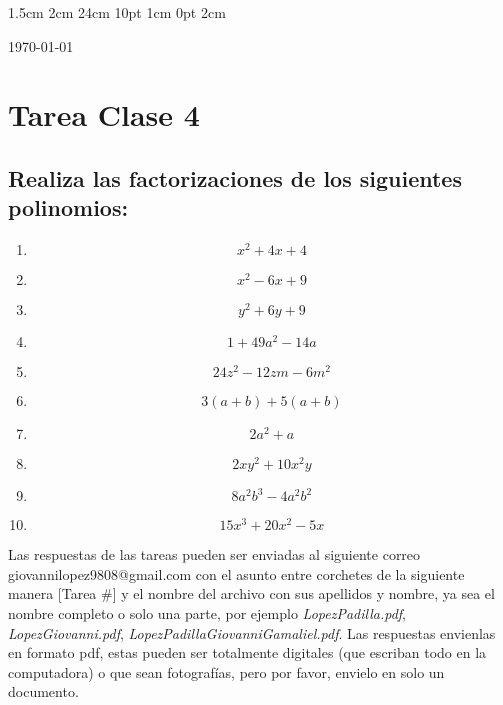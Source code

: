 \documentclass[12pt,letterpaper]{report}
\begin{document}
\setmargins{2.5cm}      
{1.5cm}                     
{2cm}  
{24cm}                    
{10pt}                          
{1cm}                          
{0pt}                             
{2cm}
\begin{flushright}
\today
\end{flushright}
\vspace{-1.75cm}
\section*{Tarea Clase 4}
\subsection*{Realiza las factorizaciones de los siguientes polinomios:}
\begin{enumerate}
\item \begin{equation*}
    x^2+4x+4
\end{equation*}
\item \begin{equation*}
    x^2-6x+9
\end{equation*}
\item \begin{equation*}
    y^2+6y+9
\end{equation*}
\item \begin{equation*}
1+49a^2-14a    
\end{equation*}
\item \begin{equation*}
24z^2-12zm-6m^2
\end{equation*}
\item \begin{equation*}
3(a+b)+5(a+b)
\end{equation*}
\item \begin{equation*}
2a^2+a    
\end{equation*}
\item \begin{equation*}
    2xy^2+10x^2y
\end{equation*}
\item \begin{equation*}
    8a^2b^3-4a^2b^2
\end{equation*}
\item \begin{equation*}
    15x^3+20x^2-5x
\end{equation*}
\end{enumerate}
Las respuestas de las tareas pueden ser enviadas al siguiente correo giovannilopez9808@gmail.com con el asunto entre corchetes de la siguiente manera [Tarea \#] y el nombre del archivo con sus apellidos y nombre, ya sea el nombre completo o solo una parte, por ejemplo \textit{LopezPadilla.pdf}, \textit{LopezGiovanni.pdf}, \textit{LopezPadillaGiovanniGamaliel.pdf}. Las respuestas envienlas en formato pdf, estas pueden ser totalmente digitales (que escriban todo en la computadora) o que sean fotografías, pero por favor, envielo en solo un documento.
\end{document}

